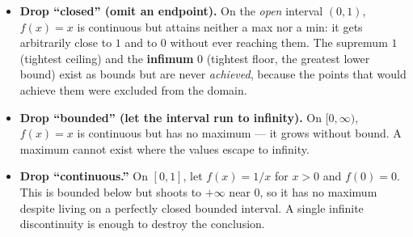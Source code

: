 \begin{itemize}
  \item \textbf{Drop ``closed'' (omit an endpoint).} On the \emph{open} interval $(0,1)$,
        $f(x)=x$ is continuous but attains neither a max nor a min: it gets arbitrarily
        close to $1$ and to $0$ without ever reaching them. The supremum $1$ (tightest
        ceiling) and the \textbf{infimum} $0$ (tightest floor, the greatest lower bound) exist as bounds but are never
        \emph{achieved}, because the points that would achieve them were excluded from the domain.
  \item \textbf{Drop ``bounded'' (let the interval run to infinity).} On $[0,\infty)$,
        $f(x)=x$ is continuous but has no maximum --- it grows without bound. A maximum
        cannot exist where the values escape to infinity.
  \item \textbf{Drop ``continuous.''} On $[0,1]$, let $f(x)=1/x$ for $x>0$ and $f(0)=0$.
        This is bounded below but shoots to $+\infty$ near $0$, so it has no maximum despite
        living on a perfectly closed bounded interval. A single infinite discontinuity is
        enough to destroy the conclusion.
\end{itemize}

